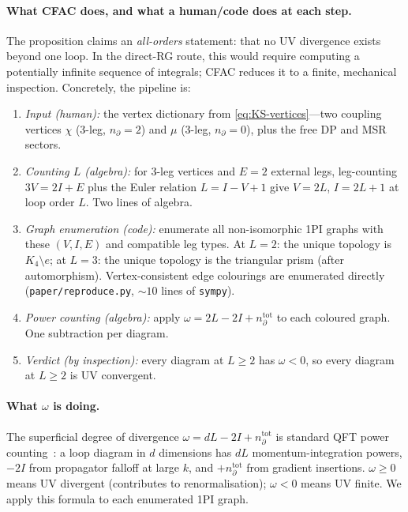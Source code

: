 \documentclass[11pt,a4paper]{article}
\theoremstyle{plain}
\begin{document}
\paragraph{What CFAC does, and what a human/code does at each step.}
The proposition claims an \emph{all-orders} statement: that no UV
divergence exists beyond one loop.  In the direct-RG route, this
would require computing a potentially infinite sequence of
integrals; CFAC reduces it to a finite, mechanical inspection.
Concretely, the pipeline is:
\begin{enumerate}[leftmargin=1.8em, itemsep=-0.2em]
\item \textit{Input (human):} the vertex dictionary from
  \eqref{eq:KS-vertices}---two coupling vertices $\chi$ (3-leg,
  $n_\partial = 2$) and $\mu$ (3-leg, $n_\partial = 0$), plus the
  free DP and MSR sectors.
\item \textit{Counting $L$ (algebra):} for 3-leg vertices and
  $E = 2$ external legs, leg-counting $3V = 2I + E$ plus the
  Euler relation $L = I - V + 1$ give $V = 2L$, $I = 2L + 1$ at
  loop order $L$.  Two lines of algebra.
\item \textit{Graph enumeration (code):} enumerate all
  non-isomorphic 1PI graphs with these $(V, I, E)$ and compatible
  leg types.  At $L = 2$: the unique topology is $K_4 \setminus e$;
  at $L = 3$: the unique topology is the triangular prism (after
  automorphism).  Vertex-consistent edge colourings are enumerated
  directly (\texttt{paper/reproduce.py}, $\sim 10$ lines of
  \texttt{sympy}).
\item \textit{Power counting (algebra):} apply
  $\omega = 2L - 2I + n_\partial^{\mathrm{tot}}$ to each coloured
  graph.  One subtraction per diagram.
\item \textit{Verdict (by inspection):} every diagram at
  $L \geq 2$ has $\omega < 0$, so every diagram at $L \geq 2$ is
  UV convergent.
\end{enumerate}

\paragraph{What $\omega$ is doing.}
The superficial degree of divergence $\omega = dL - 2I +
n_\partial^{\mathrm{tot}}$ is standard QFT power
counting~\citep{Tauber}: a loop diagram in $d$ dimensions has
$dL$ momentum-integration powers, $-2I$ from propagator falloff
at large $k$, and $+n_\partial^{\mathrm{tot}}$ from gradient
insertions.  $\omega \geq 0$ means UV divergent (contributes to
renormalisation); $\omega < 0$ means UV finite.  We apply this
formula to each enumerated 1PI graph.
\end{document}
